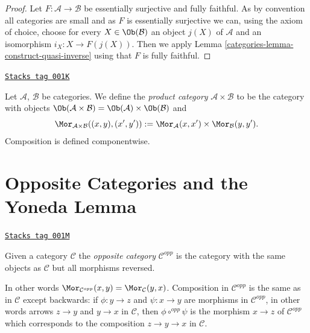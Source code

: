 \begin{proof}

Let $F : \mathcal{A} \to \mathcal{B}$ be essentially surjective and fully
faithful. As by convention all categories are small and as $F$ is essentially
surjective we can, using the axiom of choice, choose for every
$X \in \Ob(\mathcal{B})$ an object $j(X)$ of $\mathcal{A}$ and an
isomorphism $i_X : X \to F(j(X))$. Then we apply
Lemma \ref{categories-lemma-construct-quasi-inverse}
using that $F$ is fully faithful.
\end{proof}

\begin{definition}
\label{categories-definition-product-category}
\href{https://stacks.math.columbia.edu/tag/001K}{\texttt{Stacks tag 001K}}

Let $\mathcal{A}$, $\mathcal{B}$ be categories.
We define the {\it product category}
$\mathcal{A} \times \mathcal{B}$ to be the category with
objects
$\Ob(\mathcal{A} \times \mathcal{B}) =
\Ob(\mathcal{A}) \times \Ob(\mathcal{B})$
and
$$
\Mor_{\mathcal{A} \times \mathcal{B}}((x, y), (x', y'))
:=
\Mor_\mathcal{A}(x, x')\times
\Mor_\mathcal{B}(y, y').
$$
Composition is defined componentwise.
\end{definition}

\section{Opposite Categories and the Yoneda Lemma}
\label{categories-section-opposite}
\begin{definition}[Opposite]
\label{categories-definition-opposite}
\href{https://stacks.math.columbia.edu/tag/001M}{\texttt{Stacks tag 001M}}

Given a category $\mathcal{C}$ the {\it opposite category}
$\mathcal{C}^{opp}$ is the category with the same objects
as $\mathcal{C}$ but all morphisms reversed.
\end{definition}

In other words
$\Mor_{\mathcal{C}^{opp}}(x, y) = \Mor_\mathcal{C}(y, x)$.
Composition in $\mathcal{C}^{opp}$ is the same as in $\mathcal{C}$
except backwards: if $\phi : y \to z$ and $\psi : x \to y$
are morphisms in $\mathcal{C}^{opp}$, in other words arrows
$z \to y$ and $y \to x$ in $\mathcal{C}$,
then $\phi \circ^{opp} \psi$ is the morphism $x \to z$
of $\mathcal{C}^{opp}$ which corresponds to the composition
$z \to y \to x$ in $\mathcal{C}$.

